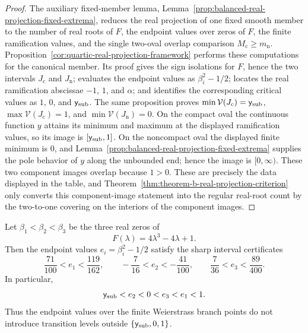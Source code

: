 \begin{proof}
The auxiliary fixed-member lemma, Lemma~\ref{prop:balanced-real-projection-fixed-extrema}, reduces the real projection of one fixed smooth member to the number of real roots of \(F\), the endpoint values over zeros of \(F\), the finite ramification values, and the single two-oval overlap comparison \(M_{\mathrm c}\ge m_{\mathrm n}\).
Proposition~\ref{cor:quartic-real-projection-framework} performs these computations for the canonical member.
Its proof gives the sign isolations for \(F\), hence the two intervals \(J_{\mathrm c}\) and \(J_{\mathrm n}\); evaluates the endpoint values as \(\beta_i^2-1/2\); locates the real ramification abscissae \(-1\), \(1\), and \(\alpha\); and identifies the corresponding critical values as \(1\), \(0\), and \(\mathsf{y}_{\mathrm{sub}}\).
The same proposition proves \(\min\mathcal V(J_{\mathrm c})=\mathsf{y}_{\mathrm{sub}}\), \(\max\mathcal V(J_{\mathrm c})=1\), and \(\min\mathcal V(J_{\mathrm n})=0\).
On the compact oval the continuous function \(y\) attains its minimum and maximum at the displayed ramification values, so its image is \([\mathsf{y}_{\mathrm{sub}},1]\).
On the noncompact oval the displayed finite minimum is \(0\), and Lemma~\ref{prop:balanced-real-projection-fixed-extrema} supplies the pole behavior of \(y\) along the unbounded end; hence the image is \([0,\infty)\).
These two component images overlap because \(1>0\).
These are precisely the data displayed in the table, and Theorem~\ref{thm:theorem-b-real-projection-criterion} only converts this component-image statement into the regular real-root count by the two-to-one covering on the interiors of the component images.
\end{proof}

\begin{lemma}\label{lem:beta-endpoint-value-certificates}
Let \(\beta_1<\beta_2<\beta_3\) be the three real zeros of
\[
F(\lambda)=4\lambda^3-4\lambda+1.
\]
Then the endpoint values \(e_i=\beta_i^2-1/2\) satisfy the sharp interval certificates
\begin{equation}\label{eq:beta-endpoint-value-intervals}
\frac{71}{100}<e_1<\frac{119}{162},
\qquad
-\frac{7}{16}<e_2<-\frac{41}{100},
\qquad
\frac{7}{36}<e_3<\frac{89}{400}.
\end{equation}
In particular,
\begin{equation}\label{eq:beta-endpoint-value-order}
\mathsf{y}_{\mathrm{sub}}<e_2<0<e_3<e_1<1.
\end{equation}
Thus the endpoint values over the finite Weierstrass branch points do not introduce transition levels outside \(\{\mathsf{y}_{\mathrm{sub}},0,1\}\).
\end{lemma}

